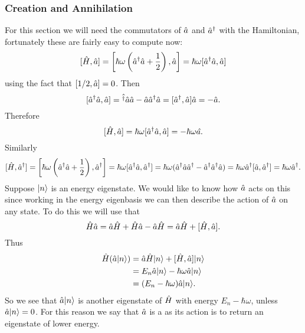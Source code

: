     \subsubsection{Creation and Annihilation}
    For this section we will need the commutators of \(\hat{a}\) and \(\hat{a}^\dagger\) with the Hamiltonian, fortunately these are fairly easy to compute now:
    \[[\hat{H}, \hat{a}] = \left[\hbar\omega\left(\hat{a}^\dagger \hat{a} + \frac{1}{2}\right), \hat{a}\right] = \hbar\omega[\hat{a}^\dagger\hat{a}, \hat{a}]\]
    using the fact that \([1/2, \hat{a}] = 0\).
    Then
    \[[\hat{a}^\dagger\hat{a}, \hat{a}] = \hat{^\dagger}\hat{a}\hat{a} - \hat{a}\hat{a}^\dagger\hat{a} = [\hat{a}^\dagger, \hat{a}]\hat{a} = -\hat{a}.\]
    Therefore
    \[[\hat{H}, \hat{a}] = \hbar\omega [\hat{a}^\dagger\hat{a}, \hat{a}] = -\hbar\omega\hat{a.}\]
    Similarly
    \[[\hat{H}, \hat{a}^\dagger] = \left[\hbar\omega\left(\hat{a}^\dagger \hat{a} + \frac{1}{2}\right), \hat{a}^\dagger\right] = \hbar\omega[\hat{a}^\dagger\hat{a}, \hat{a}^\dagger] = \hbar\omega(\hat{a}^\dagger\hat{a}\hat{a}^\dagger - \hat{a}^\dagger\hat{a}^\dagger\hat{a}) = \hbar\omega\hat{a}^\dagger[\hat{a}, \hat{a}^\dagger] = \hbar\omega\hat{a}^\dagger.\]
    Suppose \(\vert {n} \rangle\) is an energy eigenstate.
    We would like to know how \(\hat{a}\) acts on this since working in the energy eigenbasis we can then describe the action of \(\hat{a}\) on any state.
    To do this we will use that
    \[\hat{H}\hat{a} = \hat{a}\hat{H} + \hat{H}\hat{a} - \hat{a}\hat{H} = \hat{a}\hat{H} + [\hat{H}, \hat{a}].\]
    Thus
    \begin{align*}
        \hat{H}(\hat{a}\vert {n} \rangle) &= \hat{a}\hat{H}\vert {n} \rangle + [\hat{H}, \hat{a}]\vert {n} \rangle\\
        &= E_n\hat{a}\vert {n} \rangle - \hbar\omega\hat{a}\vert {n} \rangle\\
        &= (E_n - \hbar\omega)\hat{a}\vert {n} \rangle.
    \end{align*}
    So we see that \(\hat{a}\vert {n} \rangle\) is another eigenstate of \(\hat{H}\) with energy \(E_n - \hbar\omega\), unless \(\hat{a}\vert {n} \rangle = 0\).
    For this reason we say that \(\hat{a}\) is a  as its action is to return an eigenstate of lower energy.
